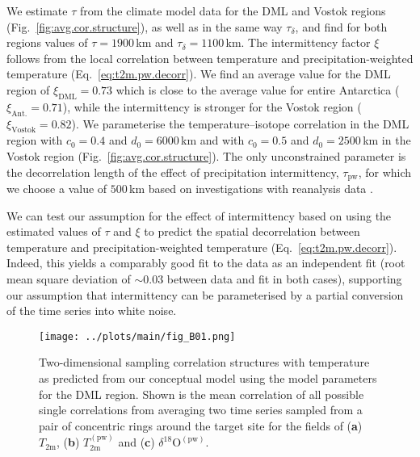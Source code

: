 \documentclass[cp, manuscript]{copernicus}
\begin{document}
We estimate $\tau$ from the climate model data for the DML and Vostok regions
(Fig.~\ref{fig:avg.cor.structure}), as well as in the same way
$\tau_{\delta}$, and find for both regions values of $\tau=1900$\,km and
$\tau_{\delta}=1100$\,km. The intermittency factor $\xi$ follows from the
local correlation between temperature and precipitation-weighted temperature
(Eq.~\ref{eq:t2m.pw.decorr}). We find an average value for the DML region of
$\xi_{\mathrm{DML}}=0.73$ which is close to the average value for entire
Antarctica ($\xi_{\mathrm{Ant.}}=0.71$), while the intermittency is stronger for
the Vostok region ($\xi_{\mathrm{Vostok}}=0.82$). We parameterise the
temperature--isotope correlation in the DML region with $c_0=0.4$ and
$d_0=6000$\,km and with $c_0=0.5$ and $d_0=2500$\,km in the Vostok region
(Fig.~\ref{fig:avg.cor.structure}). The only unconstrained parameter is the
decorrelation length of the effect of precipitation intermittency,
$\tau_{\mathrm{pw}}$, for which we choose a value of $500$\,km based on
investigations with reanalysis data \citep{Munch2018a}.

We can test our assumption for the effect of intermittency based on using the
estimated values of $\tau$ and $\xi$ to predict the spatial decorrelation
between temperature and precipitation-weighted temperature
(Eq.~\ref{eq:t2m.pw.decorr}). Indeed, this yields a comparably good fit to the
data as an independent fit (root mean square deviation of $\sim0.03$ between
data and fit in both cases), supporting our assumption that intermittency can be
parameterised by a partial conversion of the time series into white noise.

\begin{figure*}[t]%
\centering
\texttt{[image: ../plots/main/fig\_B01.png]}
\caption{%
  Two-dimensional sampling correlation structures with temperature as predicted
  from our conceptual model using the model parameters for the DML region. Shown
  is the mean correlation of all possible single correlations from averaging two
  time series sampled from a pair of concentric rings around the target site for
  the fields of (\textbf{a}) $T_{\mathrm{2m}}$, (\textbf{b})
  $T_{\mathrm{2m}}^{\mathrm{(pw)}}$ and (\textbf{c})
  $\delta^{18}\mathrm{O}^{\mathrm{(pw)}}$.}
\label{fig:conceptual.model}%
\end{figure*}%
\end{document}
